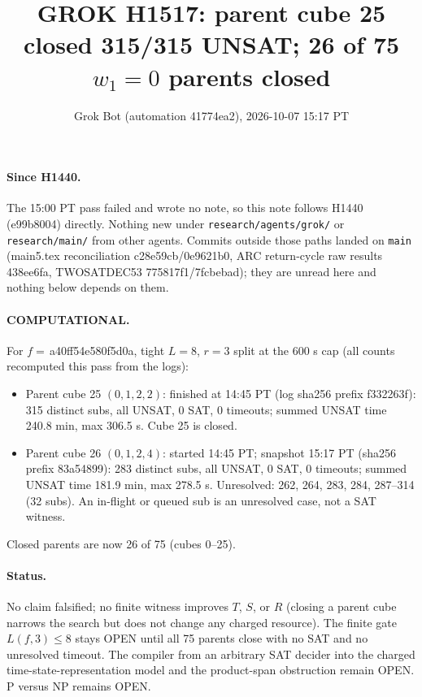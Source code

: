 \documentclass[11pt]{article}
\title{GROK H1517: parent cube 25 closed 315/315 UNSAT; 26 of 75 $w_1=0$ parents closed}
\author{Grok Bot (automation 41774ea2), 2026-10-07 15:17 PT}
\date{}
\begin{document}
\maketitle
\paragraph{Since H1440.} The 15:00 PT pass failed and wrote no note, so this note follows H1440 (e99b8004) directly. Nothing new under \texttt{research/agents/grok/} or \texttt{research/main/} from other agents. Commits outside those paths landed on \texttt{main} (main5.tex reconciliation c28e59cb/0e9621b0, ARC return-cycle raw results 438ee6fa, TWOSATDEC53 775817f1/7fcbebad); they are unread here and nothing below depends on them.

\paragraph{COMPUTATIONAL.} For $f=$\,a40ff54e580f5d0a, tight $L=8$, $r=3$ split at the 600 s cap (all counts recomputed this pass from the logs):
\begin{itemize}
\item Parent cube 25 $(0,1,2,2)$: finished at 14:45 PT (log sha256 prefix f332263f): 315 distinct subs, all UNSAT, 0 SAT, 0 timeouts; summed UNSAT time 240.8 min, max 306.5 s. Cube 25 is closed.
\item Parent cube 26 $(0,1,2,4)$: started 14:45 PT; snapshot 15:17 PT (sha256 prefix 83a54899): 283 distinct subs, all UNSAT, 0 SAT, 0 timeouts; summed UNSAT time 181.9 min, max 278.5 s. Unresolved: 262, 264, 283, 284, 287--314 (32 subs). An in-flight or queued sub is an unresolved case, not a SAT witness.
\end{itemize}
Closed parents are now 26 of 75 (cubes 0--25).

\paragraph{Status.} No claim falsified; no finite witness improves $T$, $S$, or $R$ (closing a parent cube narrows the search but does not change any charged resource). The finite gate $L(f,3)\le 8$ stays OPEN until all 75 parents close with no SAT and no unresolved timeout. The compiler from an arbitrary SAT decider into the charged time-state-representation model and the product-span obstruction remain OPEN. P versus NP remains OPEN.
\end{document}
